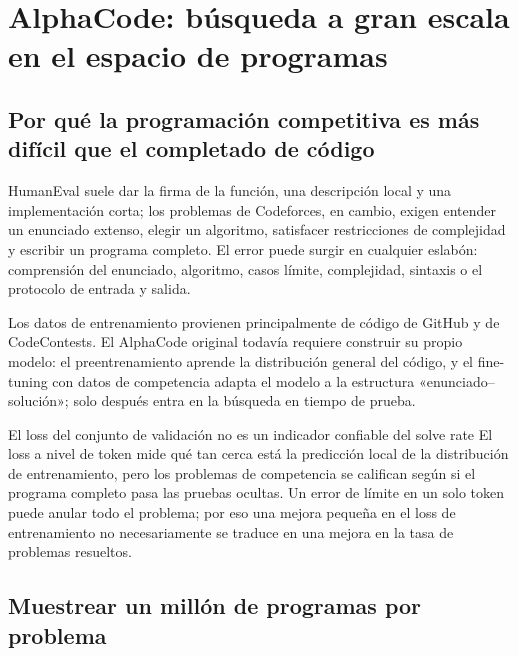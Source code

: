 \section{AlphaCode: búsqueda a gran escala en el espacio de programas}

\subsection{Por qué la programación competitiva es más difícil que el completado de código}

HumanEval suele dar la firma de la función, una descripción local y una implementación corta; los problemas de Codeforces, en cambio, exigen entender un enunciado extenso, elegir un algoritmo, satisfacer restricciones de complejidad y escribir un programa completo. El error puede surgir en cualquier eslabón: comprensión del enunciado, algoritmo, casos límite, complejidad, sintaxis o el protocolo de entrada y salida.


Los datos de entrenamiento provienen principalmente de código de GitHub y de CodeContests. El AlphaCode original todavía requiere construir su propio modelo: el preentrenamiento aprende la distribución general del código, y el fine-tuning con datos de competencia adapta el modelo a la estructura «enunciado--solución»; solo después entra en la búsqueda en tiempo de prueba.

\begin{warningbox}{El loss del conjunto de validación no es un indicador confiable del solve rate}
El loss a nivel de token mide qué tan cerca está la predicción local de la distribución de entrenamiento, pero los problemas de competencia se califican según si el programa completo pasa las pruebas ocultas. Un error de límite en un solo token puede anular todo el problema; por eso una mejora pequeña en el loss de entrenamiento no necesariamente se traduce en una mejora en la tasa de problemas resueltos.
\end{warningbox}

\subsection{Muestrear un millón de programas por problema}

